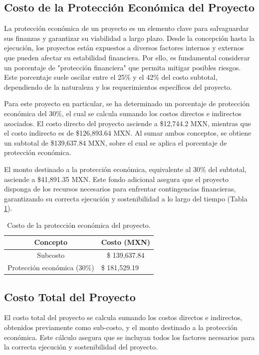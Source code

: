   \subsection{Costo de la Protección Económica del Proyecto}
  La protección económica de un proyecto es un elemento clave para salvaguardar sus finanzas y garantizar su viabilidad a largo plazo. Desde la concepción hasta la ejecución, los proyectos están expuestos a diversos factores internos y externos que pueden afectar su estabilidad financiera. Por ello, es fundamental considerar un porcentaje de "protección financiera" que permita mitigar posibles riesgos. Este porcentaje suele oscilar entre el 25\% y el 42\% del costo subtotal, dependiendo de la naturaleza y los requerimientos específicos del proyecto.
  
  Para este proyecto en particular, se ha determinado un porcentaje de protección económica del 30\%, el cual se calcula sumando los costos directos e indirectos asociados. El costo directo del proyecto asciende a \$12,744.2 MXN, mientras que el costo indirecto es de \$126,893.64 MXN. Al sumar ambos conceptos, se obtiene un subtotal de \$139,637.84 MXN, sobre el cual se aplica el porcentaje de protección económica.
  
  El monto destinado a la protección económica, equivalente al 30\% del subtotal, asciende a \$41,891.35 MXN. Este fondo adicional asegura que el proyecto disponga de los recursos necesarios para enfrentar contingencias financieras, garantizando su correcta ejecución y sostenibilidad a lo largo del tiempo (Tabla \ref{tabla:5costoprote}).
  
  \begin{table}[H]
  	\centering
  	\caption{Costo de la protección económica del proyecto.}
  	\label{tabla:5costoprote}
  	\begin{tabular}{@{}cc@{}}
  		\toprule
  		Concepto                                       & Costo (MXN)                       \\ \midrule
  		Subcosto                                       & \$ 139,637.84                     \\
  		\multicolumn{1}{l}{Protección económica (30\%)} & \multicolumn{1}{l}{\$ 181,529.19} \\ \bottomrule
  	\end{tabular}
  \end{table}
  
  
  
  \subsection{Costo Total del Proyecto}
  El costo total del proyecto se calcula sumando los costos directos e indirectos, obtenidos previamente como sub-costo, y el monto destinado a la protección económica. Este cálculo asegura que se incluyan todos los factores necesarios para la correcta ejecución y sostenibilidad del proyecto.
  
